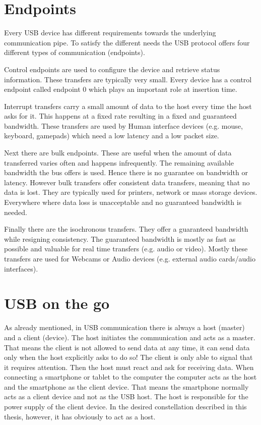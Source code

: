 \section{Endpoints}

Every USB device has different requirements towards the underlying communication pipe. To satisfy the different needs the USB protocol offers four different types of communication (endpoints).

Control endpoints are used to configure the device and retrieve status information. These transfers are typically very small. Every device has a control endpoint called endpoint 0 which plays an important role at insertion time\cite{free_usb}.

Interrupt transfers carry a small amount of data to the host every time the host asks for it. This happens at a fixed rate resulting in a fixed and guaranteed bandwidth. These transfers are used by Human interface devices (e.g. mouse, keyboard, gamepads) which need a low latency and a low packet size.

Next there are bulk endpoints. These are useful when the amount of data transferred varies often and happens infrequently. The remaining available bandwidth the bus offers is used. Hence there is no guarantee on bandwidth or latency. However bulk transfers offer consistent data transfers, meaning that no data is lost. They are typically used for printers, network or mass storage devices. Everywhere where data loss is unacceptable and no guaranteed bandwidth is needed.

Finally there are the isochronous transfers. They offer a guaranteed bandwidth while resigning consistency. The guaranteed bandwidth is mostly as fast as possible and valuable for real time transfers (e.g. audio or video). Mostly these transfers are used for Webcams or Audio devices (e.g. external audio cards/audio interfaces)\cite{free_usb}.

\section{USB on the go}

As already mentioned, in USB communication there is always a host (master) and a client (device). The host initiates the communication and acts as a master. That means the client is not allowed to send data at any time, it can send data only when the host explicitly asks to do so! The client is only able to signal that it requires attention. Then the host must react and ask for receiving data. When connecting a smartphone or tablet to the computer the computer acts as the host and the smartphone as the client device. That means the smartphone normally acts as a client device and not as the USB host. The host is responsible for the power supply of the client device. In the desired constellation described in this thesis, however, it has obviously to act as a host. 

